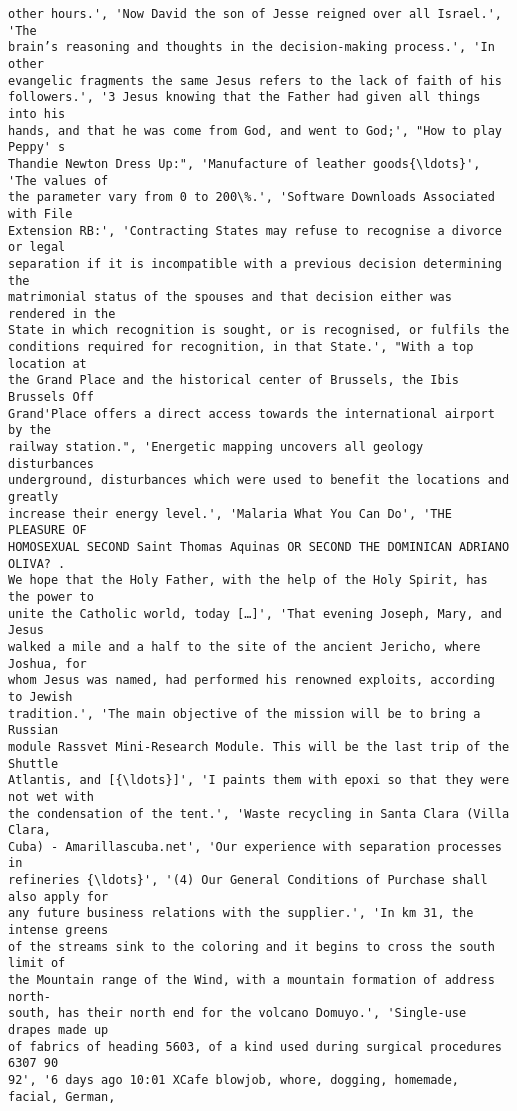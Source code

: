 \documentclass[10pt]{article}
\begin{document}
\begin{Verbatim}[commandchars=\\\{\}]
other hours.', 'Now David the son of Jesse reigned over all Israel.', 'The
brain’s reasoning and thoughts in the decision-making process.', 'In other
evangelic fragments the same Jesus refers to the lack of faith of his
followers.', '3 Jesus knowing that the Father had given all things into his
hands, and that he was come from God, and went to God;', "How to play Peppy' s
Thandie Newton Dress Up:", 'Manufacture of leather goods{\ldots}', 'The values of
the parameter vary from 0 to 200\%.', 'Software Downloads Associated with File
Extension RB:', 'Contracting States may refuse to recognise a divorce or legal
separation if it is incompatible with a previous decision determining the
matrimonial status of the spouses and that decision either was rendered in the
State in which recognition is sought, or is recognised, or fulfils the
conditions required for recognition, in that State.', "With a top location at
the Grand Place and the historical center of Brussels, the Ibis Brussels Off
Grand'Place offers a direct access towards the international airport by the
railway station.", 'Energetic mapping uncovers all geology disturbances
underground, disturbances which were used to benefit the locations and greatly
increase their energy level.', 'Malaria What You Can Do', 'THE PLEASURE OF
HOMOSEXUAL SECOND Saint Thomas Aquinas OR SECOND THE DOMINICAN ADRIANO OLIVA? .
We hope that the Holy Father, with the help of the Holy Spirit, has the power to
unite the Catholic world, today […]', 'That evening Joseph, Mary, and Jesus
walked a mile and a half to the site of the ancient Jericho, where Joshua, for
whom Jesus was named, had performed his renowned exploits, according to Jewish
tradition.', 'The main objective of the mission will be to bring a Russian
module Rassvet Mini-Research Module. This will be the last trip of the Shuttle
Atlantis, and [{\ldots}]', 'I paints them with epoxi so that they were not wet with
the condensation of the tent.', 'Waste recycling in Santa Clara (Villa Clara,
Cuba) - Amarillascuba.net', 'Our experience with separation processes in
refineries {\ldots}', '(4) Our General Conditions of Purchase shall also apply for
any future business relations with the supplier.', 'In km 31, the intense greens
of the streams sink to the coloring and it begins to cross the south limit of
the Mountain range of the Wind, with a mountain formation of address north-
south, has their north end for the volcano Domuyo.', 'Single-use drapes made up
of fabrics of heading 5603, of a kind used during surgical procedures 6307 90
92', '6 days ago 10:01 XCafe blowjob, whore, dogging, homemade, facial, German,

\end{Verbatim}
\end{document}
